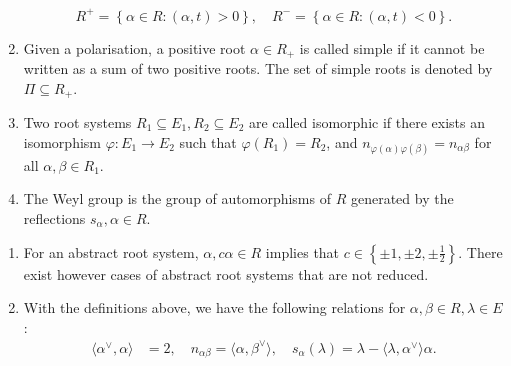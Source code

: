 \documentclass{report}
\begin{document}
\begin{definition}
\begin{enumerate}
        \[
        R^+ = \left\{ \alpha \in R : (\alpha, t) > 0 \right\}, \quad R^- = \left\{ \alpha \in R : (\alpha, t) < 0 \right\}.
        \]
        \item Given a polarisation, a positive root $\alpha \in R_+$ is called simple if it cannot be written as a sum of two positive roots.
        The set of simple roots is denoted by $\Pi \subseteq R_+$.
        \item Two root systems $R_1 \subseteq E_1, R_2 \subseteq E_2$ are called isomorphic if there exists an isomorphism $\varphi: E_1 \to E_2$ such that $\varphi(R_1) = R_2$, and $n_{\varphi(\alpha) \varphi(\beta)} = n_{\alpha \beta}$ for all $\alpha, \beta \in R_1$.
        \item The Weyl group is the group of automorphisms of $R$ generated by the reflections $s_\alpha, \alpha \in R$.
    \end{enumerate}
\end{definition}

\begin{remark}
    \begin{enumerate}[label = (\roman*)]
        \item For an abstract root system, $\alpha, c \alpha \in R$ implies that $c \in \left\{ \pm 1, \pm 2, \pm \frac{1}{2} \right\}$.
        There exist however cases of abstract root systems that are not reduced.
        \item With the definitions above, we have the following relations for $\alpha, \beta \in R, \lambda \in E$:
        \begin{align*}
            \langle \alpha^\vee,  \alpha \rangle &= 2,\quad n_{\alpha \beta} = \langle\alpha, \beta^\vee \rangle, \quad s_\alpha(\lambda) = \lambda - \langle \lambda, \alpha^\vee \rangle \alpha.
        \end{align*}
    \end{enumerate}
\end{remark}
\end{document}
